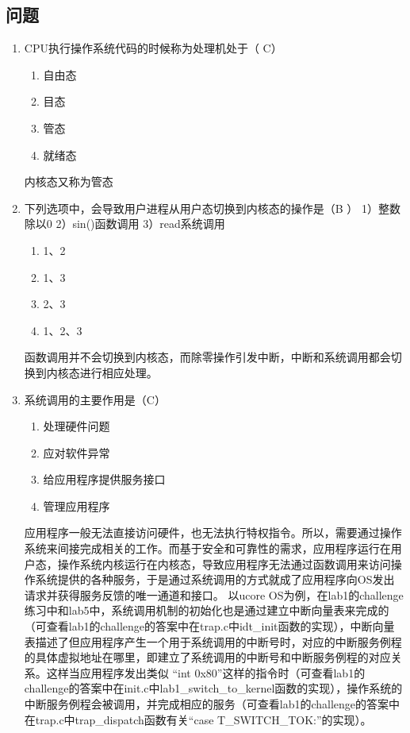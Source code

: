 \subsection{问题}
\begin{enumerate}
\item CPU执行操作系统代码的时候称为处理机处于（ C）
\begin{enumerate}[A]
	\item 自由态
	\item 目态
	\item 管态
	\item 就绪态
\end{enumerate}
内核态又称为管态

\item 下列选项中，会导致用户进程从用户态切换到内核态的操作是（B ） 1）整数除以0 2）sin()函数调用 3）read系统调用
\begin{enumerate}[A]
	\item 1、2
	\item 1、3
	\item 2、3
	\item 1、2、3
\end{enumerate}
函数调用并不会切换到内核态，而除零操作引发中断，中断和系统调用都会切换到内核态进行相应处理。

\item 系统调用的主要作用是（C）
\begin{enumerate}[A]
	\item 处理硬件问题
	\item 应对软件异常
	\item 给应用程序提供服务接口
	\item 管理应用程序
	
\end{enumerate}
应用程序一般无法直接访问硬件，也无法执行特权指令。所以，需要通过操作系统来间接完成相关的工作。而基于安全和可靠性的需求，应用程序运行在用户态，操作系统内核运行在内核态，导致应用程序无法通过函数调用来访问操作系统提供的各种服务，于是通过系统调用的方式就成了应用程序向OS发出请求并获得服务反馈的唯一通道和接口。 以ucore OS为例，在lab1的challenge练习中和lab5中，系统调用机制的初始化也是通过建立中断向量表来完成的（可查看lab1的challenge的答案中在trap.c中idt\_init函数的实现），中断向量表描述了但应用程序产生一个用于系统调用的中断号时，对应的中断服务例程的具体虚拟地址在哪里，即建立了系统调用的中断号和中断服务例程的对应关系。这样当应用程序发出类似 “int 0x80”这样的指令时（可查看lab1的challenge的答案中在init.c中lab1\_switch\_to\_kernel函数的实现），操作系统的中断服务例程会被调用，并完成相应的服务（可查看lab1的challenge的答案中在trap.c中trap\_dispatch函数有关“case T\_SWITCH\_TOK:”的实现）。



\end{enumerate}
